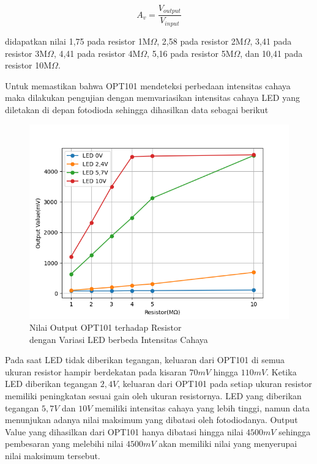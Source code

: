 \begin{equation}
  A_v = \frac{V_{output}}{V_{input}}
\end{equation}

didapatkan nilai 1,75 pada resistor 1M${\Omega}$, 2,58 pada
resistor 2M${\Omega}$, 3,41 pada resistor 3M${\Omega}$, 4,41
pada resistor 4M${\Omega}$, 5,16 pada resistor 5M${\Omega}$,
dan 10,41 pada resistor 10M${\Omega}$.

Untuk memastikan bahwa OPT101 mendeteksi perbedaan intensitas
cahaya maka dilakukan pengujian dengan memvariasikan intensitas
cahaya LED yang diletakan di depan fotodioda sehingga dihasilkan
data sebagai berikut

\begin{figure}[H]
  \centering
  \includegraphics[width=13cm]{Images/GainWLED2.png}
  \caption{Nilai Output OPT101 terhadap Resistor \vspace{0.4cm}\\dengan Variasi LED berbeda Intensitas Cahaya}
  \label{fig:gain_led}
\end{figure}

Pada saat LED tidak diberikan tegangan, keluaran dari OPT101 di
semua ukuran resistor hampir berdekatan pada kisaran ${70mV}$
hingga ${110mV}$. Ketika LED diberikan tegangan ${2,4V}$,
keluaran dari OPT101 pada setiap ukuran resistor memiliki
peningkatan sesuai gain oleh ukuran resistornya. LED yang
diberikan tegangan ${5,7V}$ dan ${10V}$ memiliki intensitas
cahaya yang lebih tinggi, namun data menunjukan adanya nilai
maksimum yang dibatasi oleh fotodiodanya. Output Value yang
dihasilkan dari OPT101 hanya dibatasi hingga nilai ${4500mV}$
sehingga pembesaran yang melebihi nilai ${4500mV}$ akan memiliki
nilai yang menyerupai nilai maksimum tersebut.


